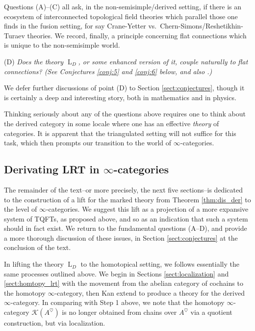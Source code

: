 \documentclass[reqno]{amsart}
\theoremstyle{definition}
\newcommand{\msc}[1]{\mathscr{#1}}
\newcommand{\opn}[1]{\operatorname{#1}}
\renewcommand{\1}{\mathbf{1}}
\begin{document}
Questions (A)--(C) all ask, in the non-semisimple/derived setting, if there is an ecosystem of interconnected topological field theories which parallel those one finds in the fusion setting, for say Crane-Yetter vs.\ Chern-Simons/Reshetikhin-Turaev theories. We record, finally, a principle concerning flat connections which is unique to the non-semisimple world.\vspace{1.5mm}

\noindent(D) {\it Does the theory $\opn{L}_D$, or some enhanced version of it, couple naturally to flat connections? (See Conjectures \ref{conj:5} and \ref{conj:6} below, and also \cite{kinnear}.)}\vspace{1.5mm}

We defer further discussions of point (D) to Section \ref{sect:conjectures}, though it is certainly a deep and interesting story, both in mathematics and in physics.

Thinking seriously about any of the questions above requires one to think about the derived category in some locale where one has an effective \emph{theory} of categories. It is apparent that the triangulated setting will not suffice for this task, which then prompts our transition to the world of $\infty$-categories.

\subsection{Derivating LRT in $\infty$-categories}

The remainder of the text--or more precisely, the next five sections--is dedicated to the construction of a lift for the marked theory from Theorem \ref{thm:dis_der} to the level of $\infty$-categories. We suggest this lift as a projection of a more expansive system of TQFTs, as proposed above, and so as an indication that such a system should in fact exist. We return to the fundamental questions (A--D), and provide a more thorough discussion of these issues, in Section \ref{sect:conjectures} at the conclusion of the text.
\par

In lifting the theory $\opn{L}_D$ to the homotopical setting, we follows essentially the same processes outlined above. We begin in Sections \ref{sect:localization} and \ref{sect:homtopy_lrt} with the movement from the abelian category of cochains to the homotopy $\infty$-category, then Kan extend to produce a theory for the derived $\infty$-category. In comparing with Step 1 above, we note that the homotopy $\infty$-category $\msc{K}(A^{\heartsuit})$ is no longer obtained from chains over $A^{\heartsuit}$ via a quotient construction, but via localization.
\end{document}
